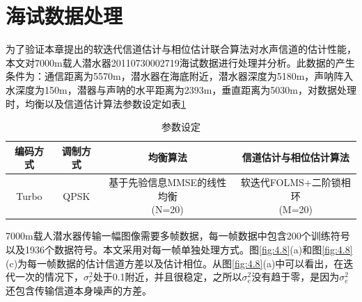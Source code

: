 \section{海试数据处理}
为了验证本章提出的软迭代信道估计与相位估计联合算法对水声信道的估计性能，本文对7000m载人潜水器20110730002719海试数据进行处理并分析。此数据的产生条件为：通信距离为5570m，潜水器在海底附近，潜水器深度为5180m，声呐阵入水深度为150m，潜器与声呐的水平距离为2393m，垂直距离为5030m，对数据处理时，均衡以及信道估计算法参数设定如表\ref{tab:4.2}
\begin{table}[hbt]
  \centering
  \caption{参数设定}
  \label{tab:4.2}
  \begin{threeparttable}
  \begin{tabular}{cccc}
    \hline
    编码方式&调制方式&均衡算法&信道估计与相位估计算法\\
    \hline
    Turbo&QPSK&\tabincell{c}{基于先验信息MMSE的线性均衡\\(N=20)}&\tabincell{c}{软迭代FOLMS+二阶锁相环\\(M=20)}\\
    \hline
  \end{tabular}
\end{threeparttable}
\end{table}

7000m载人潜水器传输一幅图像需要多帧数据，每一帧数据中包含200个训练符号以及1936个数据符号。本文采用对每一帧单独处理方式。图\ref{fig:4.8}(a)和图\ref{fig:4.8}(c)为每一帧数据的估计信道方差以及估计相位。从图\ref{fig:4.8}(a)中可以看出，在迭代一次的情况下，$\sigma_e^2$处于0.1附近，并且很稳定，之所以$\sigma_e^2$没有趋于零，是因为$\sigma_e^2$还包含传输信道本身噪声的方差。

